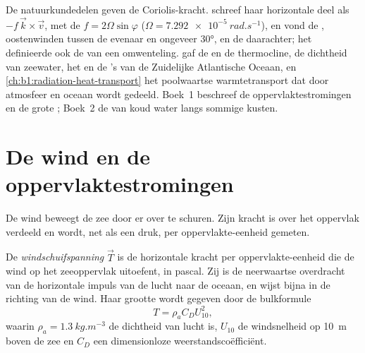\begin{recall}
De natuurkundedelen geven de Coriolis-kracht.  schreef haar horizontale deel als $-f\,\vec k\times\vec v$, met de 
$f = 2\Omega\sin\varphi$ ($\Omega = \qty{7.292e-5}{rad.s^{-1}}$), en vond de , oostenwinden tussen de evenaar en ongeveer \ang{30}, en de  daarachter; het definieerde ook de  van een omwenteling.  gaf de  en de thermocline, de dichtheid van zeewater, het  en de 's van de Zuidelijke Atlantische Oceaan, en \cref{ch:b1:radiation-heat-transport} het poolwaartse warmtetransport dat door atmosfeer en oceaan wordt gedeeld. Boek~1 beschreef de oppervlaktestromingen en de grote ; Boek~2 de  van koud water langs sommige kusten.
\end{recall}

\section{De wind en de oppervlaktestromingen}\label{sec:b1:ocean-circulation:wind}

De wind beweegt de zee door er over te schuren. Zijn kracht is over het oppervlak verdeeld en wordt, net als een druk, per oppervlakte-eenheid gemeten.

\begin{definition}[Windschuifspanning]\label{def:b1:ocean-circulation:wind-stress}
De \emph{windschuifspanning} $\vec T$ is de horizontale kracht per oppervlakte-eenheid die de wind op het zeeoppervlak uitoefent, in pascal. Zij is de neerwaartse overdracht van de horizontale impuls van de lucht naar de oceaan, en wijst bijna in de richting van de wind. Haar grootte wordt gegeven door de bulkformule
\[
  T = \rho_a C_D U_{10}^2,
\]
waarin $\rho_a = \qty{1.3}{kg.m^{-3}}$ de dichtheid van lucht is, $U_{10}$ de windsnelheid op \qty{10}{m} boven de zee en $C_D$ een dimensionloze weerstandscoëfficiënt.
\end{definition}

